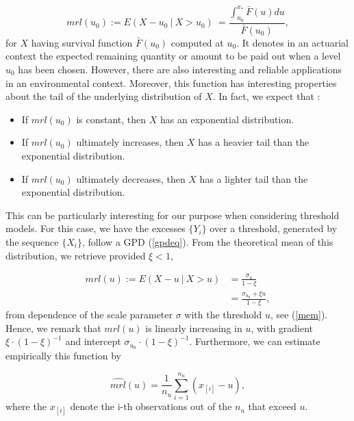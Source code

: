 \begin{equation}
mrl(u_0)
:=E(X-u_0\ |\ X>u_0) 
\ = \frac{\int_{u_0}^{x_*} \bar{F}(u)du}{\bar{F}(u_0)},
\end{equation}
for $X$ having survival function $\bar{F}(u_0)$ computed at $u_0$.
It denotes in an actuarial context
the expected remaining quantity or amount to be paid out when a level $u_0$ has been chosen. However, there are also interesting and reliable applications in an environmental context.
Moreover, this function has interesting properties about the tail of the underlying distribution of $X$. In fact, we expect that :

\begin{itemize}
	\item If $mrl(u_0)$ is constant, then $X$ has an exponential distribution.
	\item If $mrl(u_0)$ ultimately increases, then $X$ has a heavier tail than the exponential distribution.
	\item If $mrl(u_0)$ ultimately decreases, then $X$ has a lighter tail than the exponential distribution.
\end{itemize}
This can be particularly interesting for our purpose when considering threshold models. For this case, we have the excesses $\{Y_i\}$ over a threshold, generated by the sequence $\{X_i\}$, follow a GPD (\ref{gpdeq}). From the theoretical mean of this distribution, we retrieve provided $\xi<1$,

\begin{equation} \label{mrl}
\begin{aligned}
mrl(u):=E(X-u\ |\ X>u)
& = \frac{\sigma_u}{1-\xi} \\
& = \frac{\sigma_{u_0}+\xi u}{1-\xi},
\end{aligned}
\end{equation}
from dependence of the scale parameter $\sigma$ with the threshold $u$, see (\ref{mem}). Hence, we remark that $mrl(u)$ is linearly increasing in $u$, with gradient $\xi\cdot(1-\xi)^{-1}$ and intercept $\sigma_{u_0}\cdot (1-\xi)^{-1}$. Furthermore, we can estimate empirically this function by 

\begin{equation}\label{mrle}
\widehat{mrl}(u)=\frac{1}{n_u}\sum_{i=1}^{n_u}(x_{[i]}-u),
\end{equation}
where the $x_{[i]}$ denote the i-th observations out of the $n_u$ that exceed $u$.

